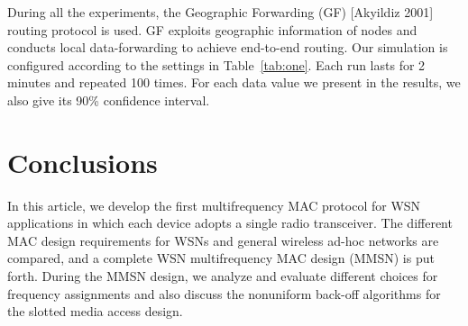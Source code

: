 During all the experiments, the Geographic Forwarding (GF)
[Akyildiz 2001] routing protocol is used. GF exploits geographic
information of nodes and conducts local data-forwarding to achieve
end-to-end routing. Our simulation is
configured according to the settings in
Table~\ref{tab:one}. Each run lasts for 2 minutes and
repeated 100 times. For each data value we present in the results,
we also give its 90\% confidence interval.
\begin{table}%
\begin{tabnote}%
\vskip2pt
\end{tabnote}%
\end{table}%

\section{Conclusions}

In this article, we develop the first multifrequency MAC protocol for
WSN applications in which each device adopts a
single radio transceiver. The different MAC design requirements for
WSNs and general wireless ad-hoc networks are
compared, and a complete WSN multifrequency MAC design (MMSN) is
put forth. During the MMSN design, we analyze and evaluate different
choices for frequency assignments and also discuss the nonuniform
back-off algorithms for the slotted media access design.

